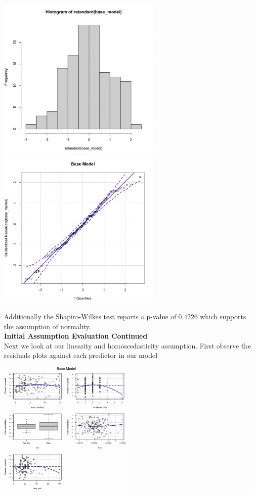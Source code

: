 \documentclass[11pt]{amsart}
\begin{document}
\begin{center}
\includegraphics[width=0.6\textwidth]{hist_base}
\includegraphics[width=0.6\textwidth]{base_qq}
\end{center}

Additionally the Shapiro-Wilkes test reports a p-value of $0.4226$ which supports the assumption of normality.\\

\newpage
{\bf\large Initial Assumption Evaluation Continued}\\
Next we look at our linearity and homoscedasticity assumption. First observe the residuals plots against each predictor in our model\\

\begin{center}
\includegraphics[width=0.5\textwidth]{base_resid}
\end{center}
\end{document}
